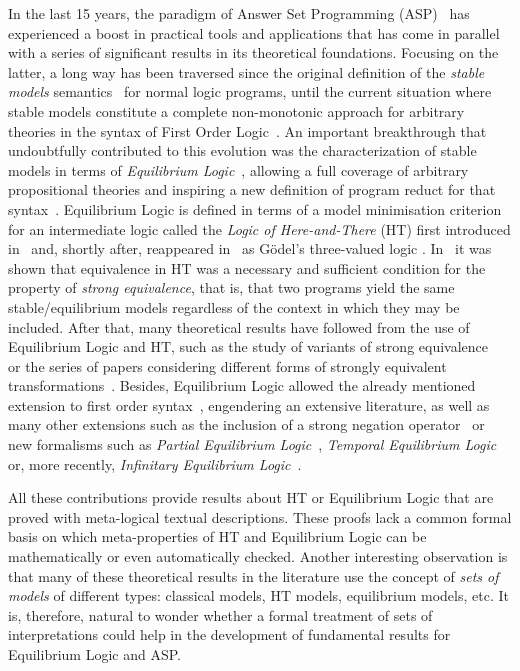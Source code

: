 \documentclass{tlp}
\begin{document}
In the last 15 years, the paradigm of Answer Set Programming (ASP)~\cite{MT99,Nie99,BET11} has experienced a boost in practical tools and applications that has come in parallel with a series of significant results in its theoretical foundations. Focusing on the latter, a long way has been traversed since the original definition of the \emph{stable models} semantics~\cite{GL88} for normal logic programs, until the current situation where stable models constitute a complete non-monotonic approach for arbitrary theories in the syntax of First Order Logic~\cite{PV04,FLL07}. An important breakthrough that undoubtfully contributed to this evolution was the characterization of stable models in terms of \emph{Equilibrium Logic}~\cite{Pea96,Pea06}, allowing a full coverage of arbitrary propositional theories and inspiring a new definition of program reduct for that syntax~\cite{Fer05}. Equilibrium Logic is defined in terms of a model minimisation criterion for an intermediate logic called the \emph{Logic of Here-and-There} (HT) first introduced in~\cite{Hey30} and, shortly after, reappeared in~\cite{God32} as G\"odel's three-valued logic . In~\cite{LPV01} it was shown that equivalence in HT was a necessary and sufficient condition for the property of \emph{strong equivalence}, that is, that two programs yield the same stable/equilibrium models regardless of the context in which they may be included. After that, many theoretical results have followed from the use of Equilibrium Logic and HT, such as the study of variants of strong equivalence~\cite{PV04b,Wol08} or the series of papers considering different forms of strongly equivalent transformations~\cite{CPV05,CF07,CPV07}. Besides, Equilibrium Logic allowed the already mentioned extension to first order syntax~\cite{PV04}, engendering an extensive literature, as well as many other extensions such as the inclusion of a strong negation operator~\cite{OP05} or new formalisms such as \emph{Partial Equilibrium Logic}~\cite{COPV07b}, \emph{Temporal Equilibrium Logic}~\cite{ACD+13} or, more recently, \emph{Infinitary Equilibrium Logic}~\cite{HLPV14}.

All these contributions provide results about HT or Equilibrium Logic that are proved with meta-logical textual descriptions. These proofs lack a common formal basis on which meta-properties of HT and Equilibrium Logic can be mathematically or even automatically checked. Another interesting observation is that many of these theoretical results in the literature use the concept of \emph{sets of models} of different types: classical models, HT models, equilibrium models, etc. It is, therefore, natural to wonder whether a formal treatment of sets of interpretations could help in the development of fundamental results for Equilibrium Logic and ASP.
\end{document}
